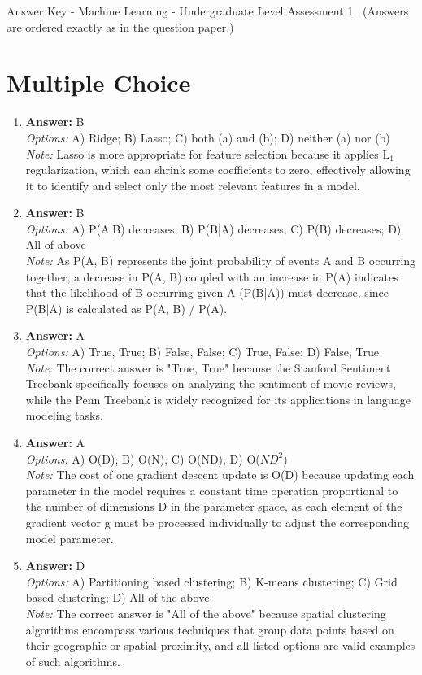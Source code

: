\documentclass[12pt]{article}
\begin{document}
\begin{center}
Answer Key - Machine Learning - Undergraduate Level Assessment 1 \
\small (Answers are ordered exactly as in the question paper.)
\end{center}

\section*{Multiple Choice}
\begin{enumerate}[label=\arabic*.]
\item \textbf{Answer:} B
\\ \textit{Options:} A) Ridge; B) Lasso; C) both (a) and (b); D) neither (a) nor (b)
\\ \textit{Note:} Lasso is more appropriate for feature selection because it applies L$_{1}$ regularization, which can shrink some coefficients to zero, effectively allowing it to identify and select only the most relevant features in a model.
\item \textbf{Answer:} B
\\ \textit{Options:} A) P(A|B) decreases; B) P(B|A) decreases; C) P(B) decreases; D) All of above
\\ \textit{Note:} As P(A, B) represents the joint probability of events A and B occurring together, a decrease in P(A, B) coupled with an increase in P(A) indicates that the likelihood of B occurring given A (P(B|A)) must decrease, since P(B|A) is calculated as P(A, B) / P(A).
\item \textbf{Answer:} A
\\ \textit{Options:} A) True, True; B) False, False; C) True, False; D) False, True
\\ \textit{Note:} The correct answer is "True, True" because the Stanford Sentiment Treebank specifically focuses on analyzing the sentiment of movie reviews, while the Penn Treebank is widely recognized for its applications in language modeling tasks.
\item \textbf{Answer:} A
\\ \textit{Options:} A) O(D); B) O(N); C) O(ND); D) O($ND^2$)
\\ \textit{Note:} The cost of one gradient descent update is O(D) because updating each parameter in the model requires a constant time operation proportional to the number of dimensions D in the parameter space, as each element of the gradient vector g must be processed individually to adjust the corresponding model parameter.
\item \textbf{Answer:} D
\\ \textit{Options:} A) Partitioning based clustering; B) K-means clustering; C) Grid based clustering; D) All of the above
\\ \textit{Note:} The correct answer is "All of the above" because spatial clustering algorithms encompass various techniques that group data points based on their geographic or spatial proximity, and all listed options are valid examples of such algorithms.
\end{enumerate}
\end{document}
